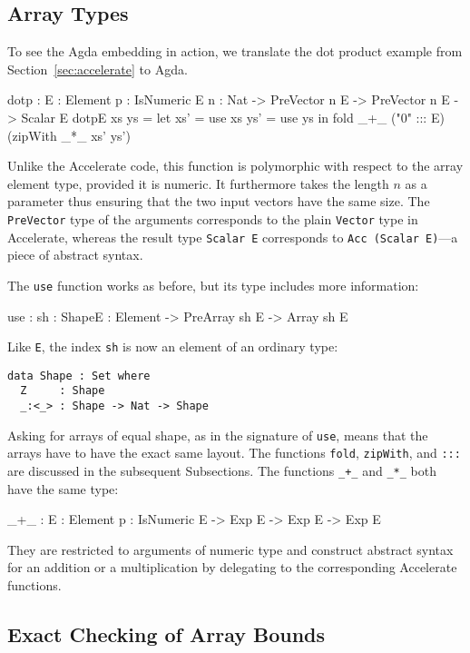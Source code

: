 \documentclass{llncs}
\begin{document}
\subsection{Array Types}
\label{sec:array-types}

To see the Agda embedding in action, we translate the
dot product example from Section~\ref{sec:accelerate} to Agda.
\begin{code}
dotp : {E : Element} {{p : IsNumeric E}} {n : Nat}
     -> PreVector n E -> PreVector n E -> Scalar E
dotp{E} xs ys = 
  let xs' = use xs
      ys' = use ys
  in
  fold _+_ ("0" ::: E) (zipWith _*_ xs' ys')
\end{code}
Unlike the Accelerate code, this function is polymorphic with respect
to the array element type, provided it is numeric. It furthermore
takes the length $n$ as a parameter thus ensuring that the two input
vectors have the same size. The \texttt{PreVector} type of the
arguments corresponds to the plain \texttt{Vector} type in Accelerate,
whereas the result type \texttt{Scalar E} corresponds to \texttt{Acc
  (Scalar E)}---a piece of abstract syntax. 

The \texttt{use} function works as before, but its type
includes more information:
\begin{code}
use : {sh : Shape}{E : Element} -> PreArray sh E -> Array sh E
\end{code}
Like \texttt{E}, the index \texttt{sh} is now an element of an ordinary type:
\begin{verbatim}
data Shape : Set where
  Z     : Shape
  _:<_> : Shape -> Nat -> Shape
\end{verbatim}
Asking for arrays of equal shape, as in the signature of \texttt{use},
means that the arrays have to have the exact same layout.
The functions \texttt{fold}, \texttt{zipWith}, and \texttt{:::} are
discussed in the subsequent Subsections. The functions \verb|_+_| and
\verb|_*_| both have the same type:
\begin{code}
_+_ : {E : Element} {{p : IsNumeric E}} -> Exp E -> Exp E -> Exp E
\end{code}
They are restricted to arguments of numeric type and construct
abstract syntax for an addition or a multiplication by delegating to
the corresponding Accelerate functions.



\subsection{Exact Checking of Array Bounds}
\label{sec:exact-checking-array}
\end{document}
